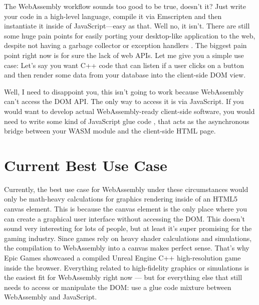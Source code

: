 \documentclass[10pt]{article}
\begin{document}
\begin{sloppypar}
  The WebAssembly workflow sounds too good to be true, doesn’t it? Just write your code in a high-level language, compile it via Emscripten and then instantiate it inside of JavaScript—easy as that. Well no, it isn’t. There are still some huge pain points for easily porting your desktop-like application to the web, despite not having a garbage collector or exception handlers \citep{w3c_roadmap_2019}. The biggest pain point right now is for sure the lack of web APIs. Let me give you a simple use case: Let’s say you want C++ code that can listen if a user clicks on a button and then render some data from your database into the client-side DOM view.

  Well, I need to disappoint you, this isn’t going to work because WebAssembly can’t access the DOM API. The only way to access it is via JavaScript. If you would want to develop actual WebAssembly-ready client-side software, you would need to write some kind of JavaScript glue code \citep{mihaylov_how_2018}, that acts as the asynchronous bridge between your WASM module and the client-side HTML page.

  \begin{figure}[ht]
    \centering
    \label{fig:glue-code}
  \end{figure}

  \section{Current Best Use Case}
  \label{sec:use-cases}

  Currently, the best use case for WebAssembly under these circumstances would only be math-heavy calculations for graphics rendering inside of an HTML5 canvas element. This is because the canvas element is the only place where you can create a graphical user interface without accessing the DOM. This doesn’t sound very interesting for lots of people, but at least it’s super promising for the gaming industry. Since games rely on heavy shader calculations and simulations, the compilation to WebAssembly into a canvas makes perfect sense. That’s why Epic Games showcased a compiled Unreal Engine C++ high-resolution game inside the browser. Everything related to high-fidelity graphics or simulations is the easiest fit for WebAssembly right now — but for everything else that still needs to access or manipulate the DOM: use a glue code mixture between WebAssembly and JavaScript.


\end{sloppypar}
\end{document}
